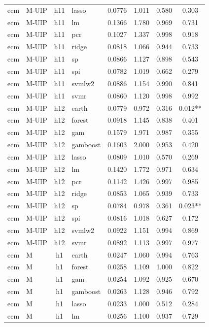 \begin{ThreePartTable}
\begin{longtable}[t]{llclcccc}
ecm & M-UIP & h11 & lasso & 0.0776 & 1.011 & 0.580 & 0.303\\
ecm & M-UIP & h11 & lm & 0.1366 & 1.780 & 0.969 & 0.731\\
ecm & M-UIP & h11 & pcr & 0.1027 & 1.337 & 0.998 & 0.918\\
ecm & M-UIP & h11 & ridge & 0.0818 & 1.066 & 0.944 & 0.733\\
ecm & M-UIP & h11 & sp & 0.0866 & 1.127 & 0.898 & 0.543\\
ecm & M-UIP & h11 & spi & 0.0782 & 1.019 & 0.662 & 0.279\\
ecm & M-UIP & h11 & svmlw2 & 0.0886 & 1.154 & 0.990 & 0.841\\
ecm & M-UIP & h11 & svmr & 0.0860 & 1.120 & 0.998 & 0.992\\
\addlinespace
ecm & M-UIP & h12 & earth & 0.0779 & 0.972 & 0.316 & 0.012**\\
ecm & M-UIP & h12 & forest & 0.0918 & 1.145 & 0.838 & 0.401\\
ecm & M-UIP & h12 & gam & 0.1579 & 1.971 & 0.987 & 0.355\\
ecm & M-UIP & h12 & gamboost & 0.1603 & 2.000 & 0.953 & 0.420\\
ecm & M-UIP & h12 & lasso & 0.0809 & 1.010 & 0.570 & 0.269\\
ecm & M-UIP & h12 & lm & 0.1420 & 1.772 & 0.971 & 0.634\\
ecm & M-UIP & h12 & pcr & 0.1142 & 1.426 & 0.997 & 0.985\\
ecm & M-UIP & h12 & ridge & 0.0853 & 1.065 & 0.939 & 0.733\\
ecm & M-UIP & h12 & sp & 0.0784 & 0.978 & 0.361 & 0.023**\\
ecm & M-UIP & h12 & spi & 0.0816 & 1.018 & 0.627 & 0.172\\
ecm & M-UIP & h12 & svmlw2 & 0.0922 & 1.151 & 0.994 & 0.869\\
ecm & M-UIP & h12 & svmr & 0.0892 & 1.113 & 0.997 & 0.977\\
\addlinespace
ecm & M & h1 & earth & 0.0247 & 1.060 & 0.994 & 0.763\\
ecm & M & h1 & forest & 0.0258 & 1.109 & 1.000 & 0.822\\
ecm & M & h1 & gam & 0.0254 & 1.092 & 0.925 & 0.670\\
ecm & M & h1 & gamboost & 0.0263 & 1.128 & 0.946 & 0.792\\
ecm & M & h1 & lasso & 0.0233 & 1.000 & 0.512 & 0.284\\
ecm & M & h1 & lm & 0.0256 & 1.100 & 0.937 & 0.729\\

\end{longtable}
\end{ThreePartTable}
